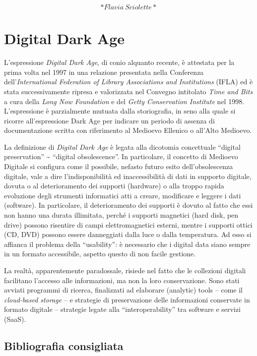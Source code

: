 \documentclass[
  b5paper,
  twoside,
  12pt,
  chapterprefix=false,
  bibliography=totocnumbered,
  parskip=false]{scrbook}
\begin{document}
\[*Flavia~Sciolette*\]

\hypertarget{digital-dark-age}{%
\chapter{Digital Dark Age}\label{digital-dark-age}}

L'espressione \emph{Digital Dark Age}, di conio alquanto recente, è attestata
per la prima volta nel 1997 in una relazione presentata nella Conferenza
dell'\emph{International Federation of Library Associations and Institutions}
(IFLA) ed è stata successivamente ripresa e valorizzata nel Convegno
intitolato \emph{Time and Bits} a cura della \emph{Long Now Foundation} e del
\emph{Getty Conservation Institute} nel 1998. L'espressione è parzialmente
mutuata dalla storiografia, in seno alla quale si ricorre
all'espressione Dark Age per indicare un periodo di assenza di
documentazione scritta con riferimento al Medioevo Ellenico o all'Alto
Medioevo.

La definizione di \emph{Digital Dark Age} è legata alla dicotomia concettuale
\enquote{digital preservation} \textasciitilde{} \enquote{digital obsolescence}. In particolare, il
concetto di Medioevo Digitale si configura come il possibile, nefasto
futuro esito dell'obsolescenza digitale, vale a dire l'indisponibilità
ed inaccessibilità di dati in supporto digitale, dovuta o al
deterioramento dei supporti (hardware) o alla troppo rapida evoluzione
degli strumenti informatici atti a creare, modificare e leggere i dati
(software). In particolare, il deterioramento dei supporti è dovuto al
fatto che essi non hanno una durata illimitata, perché i supporti
magnetici (hard disk, pen drive) possono risentire di campi
elettromagnetici esterni, mentre i supporti ottici (CD, DVD) possono
essere danneggiati dalla luce o dalla temperatura. Ad esso si affianca
il problema della \enquote{usability}: è necessario che i digital data siano
sempre in un formato accessibile, aspetto questo di non facile gestione.

La realtà, apparentemente paradossale, risiede nel fatto che le
collezioni digitali facilitano l'accesso alle informazioni, ma non la
loro conservazione. Sono stati avviati programmi di ricerca, finalizzati
ad elaborare (analytic) tools -- come il \emph{cloud-based storage} -- e
strategie di preservazione delle informazioni conservate in formato
digitale -- strategie legate alla \enquote{interoperability} tra software e
servizi (SaaS).

\hypertarget{bibliografia-consigliata-6}{%
\section*{Bibliografia consigliata}\label{bibliografia-consigliata-6}}
\end{document}

